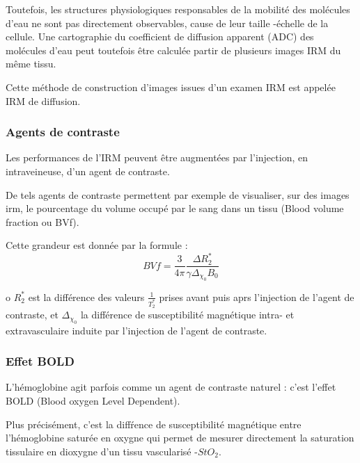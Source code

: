 \par
Toutefois, les structures physiologiques responsables de la mobilit\'e des mol\'ecules d'eau ne sont pas directement observables, %
 cause de leur taille -\'echelle de la cellule. %
Une cartographie du coefficient de diffusion apparent (ADC) des mol\'ecules d'eau peut toutefois \^etre calcul\'ee  partir de plusieurs images IRM du m\^eme tissu.

\par
Cette m\'ethode de construction d'images issues d'un examen IRM est appel\'ee IRM de diffusion.

\subsubsection{Agents de contraste}

Les performances de l'IRM peuvent \^etre augment\'ees par l'injection, en intraveineuse, d'un agent de contraste.

\par
De tels agents de contraste permettent par exemple de visualiser, sur des images irm, %
le pourcentage du volume occup\'e par le sang dans un tissu (Blood volume fraction ou BVf).

\par
Cette grandeur est donn\'ee par la formule \cite{Lem_PHD_10} :
\begin{equation}
BVf=\frac{3}{4\pi}\frac{\Delta R_2^{\ast}}{\gamma \Delta_{\chi_0}B_0}
\label{bvf_gd}
\end{equation}

o $R_2^{\ast}$ est la diff\'erence des valeurs $\frac{1}{T_2^{\ast}}$ prises avant puis aprs l'injection de l'agent de contraste, %
et $\Delta_{\chi_0}$ la diff\'erence de susceptibilit\'e magn\'etique intra- et extravasculaire induite par l'injection de l'agent de contraste.

\subsubsection{Effet BOLD}

L'h\'emoglobine agit parfois comme un agent de contraste naturel : c'est l'effet BOLD (Blood oxygen Level Dependent).

\par
Plus pr\'ecis\'ement, c'est la diff\'rence de susceptibilit\'e magn\'etique entre l'h\'emoglobine satur\'ee en oxygne %
qui permet de mesurer directement la saturation tissulaire en dioxygne d'un tissu vascularis\'e -$StO_2$.

